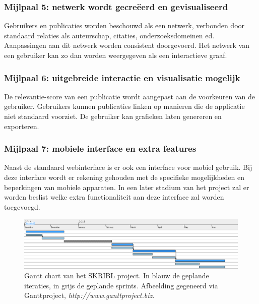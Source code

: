 \documentclass{article}
\begin{document}
\subsubsection*{Mijlpaal 5: netwerk wordt gecre\"{e}erd en gevisualiseerd}
Gebruikers en publicaties worden beschouwd als een netwerk, verbonden door standaard relaties als auteurschap, citaties, onderzoeksdomeinen ed. Aanpassingen aan dit netwerk worden consistent doorgevoerd.
Het netwerk van een gebruiker kan zo dan worden weergegeven als een interactieve graaf.

\subsubsection*{Mijlpaal 6: uitgebreide interactie en visualisatie mogelijk}
De relevantie-score van een publicatie wordt aangepast aan de voorkeuren van de gebruiker.
Gebruikers kunnen publicaties linken op manieren die de applicatie niet standaard voorziet.
De gebruiker kan grafieken laten genereren en exporteren.

\subsubsection*{Mijlpaal 7: mobiele interface en extra features}
Naast de standaard webinterface is er ook een interface voor mobiel gebruik. Bij deze interface wordt er rekening gehouden met de specifieke mogelijkheden en beperkingen van mobiele apparaten. In een later stadium van het project zal er worden beslist welke extra functionaliteit aan deze interface zal worden toegevoegd. \newline
\\

\begin{figure}[h!]
 \includegraphics[width=150mm]{gantt_cropped.png}
 \caption{Gantt chart van het SKRIBL project. In blauw de geplande iteraties, in grijs de geplande sprints. \small{Afbeelding gegeneerd via Ganttproject, \emph{http://www.ganttproject.biz}}.}
 \label{GanttChart}
\end{figure}
\end{document}

